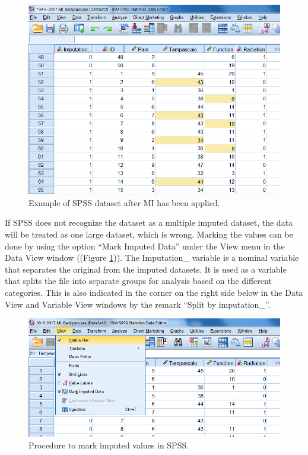 \documentclass[]{book}
\theoremstyle{definition}
\theoremstyle{definition}
\theoremstyle{definition}
\theoremstyle{remark}
\begin{document}
\begin{figure}

{\centering \includegraphics[width=0.9\linewidth]{images/fig5.1} 

}

\caption{Example of SPSS dataset after MI has been applied.}\label{fig:fig5-1}
\end{figure}

If SPSS does not recognize the dataset as a multiple imputed dataset,
the data will be treated as one large dataset, which is wrong. Marking
the values can be done by using the option ``Mark Imputed Data'' under
the View menu in the Data View window ((Figure \ref{fig:fig5-1})). The
Imputation\_ variable is a nominal variable that separates the original
from the imputed datasets. It is used as a variable that splits the file
into separate groups for analysis based on the different categories.
This is also indicated in the corner on the right side below in the Data
View and Variable View windows by the remark ``Split by imputation\_''.

\begin{figure}

{\centering \includegraphics[width=0.9\linewidth]{images/fig5.2} 

}

\caption{Procedure to mark imputed values in SPSS.}\label{fig:fig5-2}
\end{figure}
\end{document}
